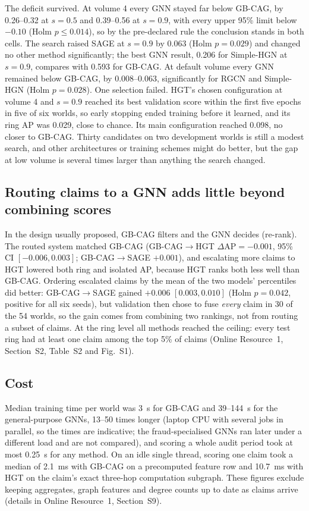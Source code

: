 \documentclass[pdflatex,sn-vancouver-num]{sn-jnl}
\newcommand{\SSecRouting}{S2}\newcommand{\STabRouting}{S2}\newcommand{\SFigRouting}{S1}
\newcommand{\SSecCost}{S9}
\begin{document}
The deficit survived. At volume 4 every GNN stayed far below GB-CAG, by
0.26--0.32 at $s=0.5$ and 0.39--0.56 at $s=0.9$, with every upper 95\% limit
below $-0.10$ (Holm $p\le0.014$), so by the pre-declared rule the conclusion
stands in both cells. The search raised SAGE at $s=0.9$ by 0.063 (Holm
$p=0.029$) and changed no other method significantly; the best GNN result,
0.206 for Simple-HGN at $s=0.9$, compares with 0.593 for GB-CAG. At default
volume every GNN remained below GB-CAG, by 0.008--0.063, significantly for RGCN
and Simple-HGN (Holm $p=0.028$). One selection failed. HGT's chosen
configuration at volume 4 and $s=0.9$ reached its best validation score within
the first five epochs in five of six worlds, so early stopping ended training
before it learned, and its ring AP was 0.029, close to chance. Its main
configuration reached 0.098, no closer to GB-CAG. Thirty candidates on two
development worlds is still a modest search, and other architectures or
training schemes might do better, but the gap at low volume is several times
larger than anything the search changed.

\subsection{Routing claims to a GNN adds little beyond combining scores}\label{sec:routingres}
In the design usually proposed, GB-CAG filters and the GNN decides
(re-rank). The routed system matched GB-CAG (GB-CAG$\to$HGT
$\Delta\text{AP}=-0.001$, 95\% CI $[-0.006, 0.003]$; GB-CAG$\to$SAGE
$+0.001$), and escalating more claims to HGT lowered both ring and isolated
AP, because HGT ranks both less well than GB-CAG. Ordering escalated claims
by the mean of the two models' percentiles did better: GB-CAG$\to$SAGE gained
$+0.006$ $[0.003, 0.010]$ (Holm $p=0.042$, positive for all six seeds), but
validation then chose to fuse \emph{every} claim in 30 of the 54 worlds, so
the gain comes from combining two rankings, not from routing a subset of
claims. At the ring level all methods reached the ceiling: every test ring
had at least one claim among the top 5\% of claims (Online Resource~1,
Section~\SSecRouting, Table~\STabRouting{} and Fig.~\SFigRouting).

\subsection{Cost}\label{sec:cost}
Median training time per world was 3~s for GB-CAG and 39--144~s for the
general-purpose GNNs, 13--50 times longer (laptop CPU with several jobs in
parallel, so the times are indicative; the fraud-specialised GNNs ran later
under a different load and are not compared), and scoring a whole audit period took at most 0.25~s for any
method. On an idle single thread, scoring one claim took a median of 2.1~ms
with GB-CAG on a precomputed feature row and 10.7~ms with HGT on the claim's
exact three-hop computation subgraph. These figures exclude keeping
aggregates, graph features and degree counts up to date as claims arrive
(details in Online Resource~1, Section~\SSecCost).
\end{document}
